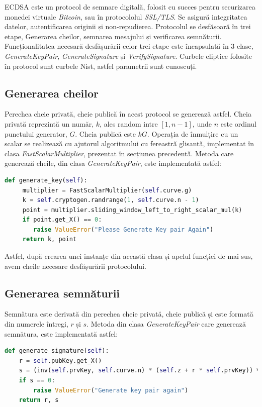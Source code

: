ECDSA este un protocol de semnare digitală, folosit cu succes pentru securizarea monedei virtuale \textit{Bitcoin}, sau în protocololul \textit{SSL/TLS}. Se asigură integritatea datelor, autentificarea originii și non-repudierea. Protocolul se desfășoară în trei etape, Generarea cheilor, semnarea mesajului și verificarea semnăturii. Funcționalitatea necesară desfășurării celor trei etape este încapsulată în 3 clase, \textit{GenerateKeyPair}, \textit{GenerateSignature} și \textit{VerifySignature}. Curbele eliptice folosite în protocol sunt curbele Nist, astfel parametrii sunt cunoscuți.

\subsection{Generarea cheilor}

Perechea cheie privată, cheie publică în acest protocol se generează astfel. Cheia privată reprezintă un număr, $k$, ales random intre $[1, n-1]$, unde $n$ este ordinul punctului generator, $G$. Cheia publică este $kG$. Operația de înmulțire cu un scalar se realizează cu ajutorul algoritmului cu fereastră glisantă, implementat în clasa \textit{FastScalarMultiplier}, prezentat în secțiunea precedentă. Metoda care generează cheile, din clasa \textit{GenerateKeyPair}, este implementată astfel:
\begin{lstlisting}[language=Python]
 def generate_key(self):
     multiplier = FastScalarMultiplier(self.curve.g)
     k = self.cryptogen.randrange(1, self.curve.n - 1)
     point = multiplier.sliding_window_left_to_right_scalar_mul(k)
     if point.get_X() == 0:
        raise ValueError("Please Generate Key pair Again")
     return k, point
\end{lstlisting}
Astfel, după crearea unei instanțe din această clasa și apelul funcției de mai sus, avem cheile necesare desfășurării protocolului.

\subsection{Generarea semnăturii}
Semnătura este derivată din perechea cheie privată, cheie publică și este formată din numerele întregi, $r$ și $s$. Metoda din clasa \textit{GenerateKeyPair} care generează semnătura, este implementată astfel:

\begin{lstlisting}[language=Python]
def generate_signature(self):
    r = self.pubKey.get_X()
    s = (inv(self.prvKey, self.curve.n) * (self.z + r * self.prvKey)) % self.curve.n
    if s == 0:
        raise ValueError("Generate key pair again")
    return r, s
\end{lstlisting}

